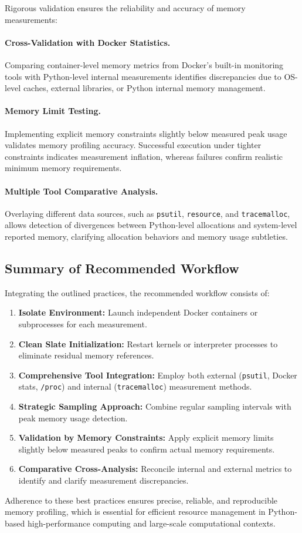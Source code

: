 Rigorous validation ensures the reliability and accuracy of memory measurements:

\paragraph{Cross-Validation with Docker Statistics.}
Comparing container-level memory metrics from Docker's built-in monitoring tools with Python-level internal measurements identifies discrepancies due to \ac{OS}-level caches, external libraries, or Python internal memory management.

\paragraph{Memory Limit Testing.}
Implementing explicit memory constraints slightly below measured peak usage validates memory profiling accuracy.
Successful execution under tighter constraints indicates measurement inflation, whereas failures confirm realistic minimum memory requirements.

\paragraph{Multiple Tool Comparative Analysis.}
Overlaying different data sources, such as \texttt{psutil}, \texttt{resource}, and \texttt{tracemalloc}, allows detection of divergences between Python-level allocations and system-level reported memory, clarifying allocation behaviors and memory usage subtleties.

\subsection{Summary of Recommended Workflow}
\label{subsec:mmc-bestpractices-summary}

Integrating the outlined practices, the recommended workflow consists of:

\begin{enumerate}
    \item \textbf{Isolate Environment:} Launch independent Docker containers or subprocesses for each measurement.
    \item \textbf{Clean Slate Initialization:} Restart kernels or interpreter processes to eliminate residual memory references.
    \item \textbf{Comprehensive Tool Integration:} Employ both external (\texttt{psutil}, Docker stats, \texttt{/proc}) and internal (\texttt{tracemalloc}) measurement methods.
    \item \textbf{Strategic Sampling Approach:} Combine regular sampling intervals with peak memory usage detection.
    \item \textbf{Validation by Memory Constraints:} Apply explicit memory limits slightly below measured peaks to confirm actual memory requirements.
    \item \textbf{Comparative Cross-Analysis:} Reconcile internal and external metrics to identify and clarify measurement discrepancies.
\end{enumerate}

Adherence to these best practices ensures precise, reliable, and reproducible memory profiling, which is essential for efficient resource management in Python-based high-performance computing and large-scale computational contexts.